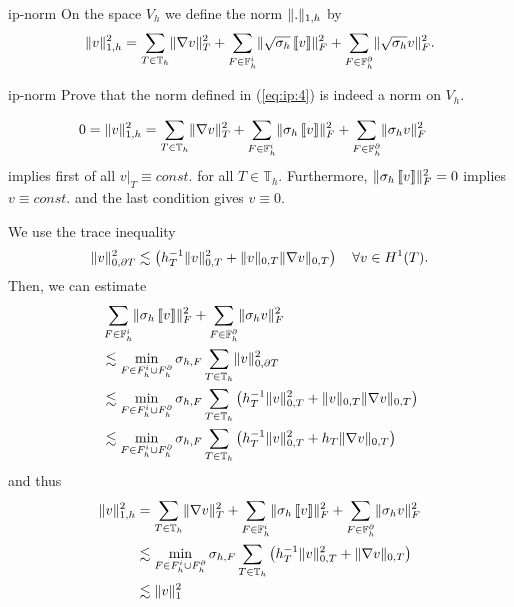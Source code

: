 \begin{Definition}{ip-norm}
  On the space $V_h$ we define the norm $\lVert.\rVert_{1,h}$ by
  \begin{gather}
    \label{eq:ip:4}
    \lVert v\rVert_{1,h}^2 = \sum_{T\in\mathbb T_h} \lVert\nabla v\rVert_T^2
    + \sum_{F\in\mathbb F_h^i} \lVert\sqrt{\sigma_h}\left\llbracket v\right\rrbracket\rVert_F^2
    + \sum_{F\in\mathbb F_h^\partial} \lVert\sqrt{\sigma_h}v\rVert_F^2.
  \end{gather}
\end{Definition}

\begin{Problem}{ip-norm}
  Prove that the norm defined in (\ref{eq:ip:4}) is indeed a norm on $V_h$.
\begin{solution}
\begin{align*}
  0=\lVert v\rVert_{1,h}^2 &= \sum_{T\in\mathbb T_h} \lVert\nabla v\rVert_T^2
    + \sum_{F\in\mathbb F_h^i} \lVert\sigma_h\left\llbracket v\right\rrbracket\rVert_F^2
    + \sum_{F\in\mathbb F_h^\partial} \lVert\sigma_hv\rVert_F^2
\end{align*}
implies first of all $v|_T \equiv const.$ for all $T \in \mathbb{T}_h$.
Furthermore, $\lVert\sigma_h\left\llbracket v\right\rrbracket\rVert_F^2=0$ implies $v \equiv const.$
and the last condition gives $v \equiv 0$.

 We use the trace inequality
 \begin{align*}
  \lVert v\rVert_{0,\partial T}^2
  \lesssim \left( h_T^{-1} \lVert v\rVert_{0,T}^2+\lVert v\rVert_{0,T}\lVert\nabla v\rVert_{0,T}\right)
  \quad \forall v \in H^1(T).
 \end{align*}
 Then, we can estimate
 \begin{align*}
  &\sum_{F\in\mathbb F_h^i} \lVert\sigma_h\left\llbracket v\right\rrbracket\rVert_F^2 + \sum_{F\in\mathbb F_h^\partial} \lVert\sigma_hv\rVert_F^2\\
  &\lesssim \min_{F\in F_h^i\cup F_h^\partial} \sigma_{h,F} \sum_{T \in \mathbb{T}_h}\lVert v\rVert_{0,\partial T}^2 \\
  &\lesssim \min_{F\in F_h^i\cup F_h^\partial} \sigma_{h,F} \sum_{T \in \mathbb{T}_h}\left( h_T^{-1}
  \lVert v\rVert_{0,T}^2+\lVert v\rVert_{0,T}\lVert\nabla v\rVert_{0,T}\right)\\
  &\lesssim \min_{F\in F_h^i\cup F_h^\partial} \sigma_{h,F} \sum_{T \in \mathbb{T}_h}\left( h_T^{-1}
  \lVert v\rVert_{0,T}^2+h_T\lVert\nabla v\rVert_{0,T}\right)
 \end{align*}
 and thus
 \begin{align*}
    \lVert v\rVert_{1,h}^2 &= \sum_{T\in\mathbb T_h} \lVert\nabla v\rVert_T^2
    + \sum_{F\in\mathbb F_h^i} \lVert\sigma_h\left\llbracket v\right\rrbracket\rVert_F^2
    + \sum_{F\in\mathbb F_h^\partial} \lVert\sigma_hv\rVert_F^2\\
    &\lesssim \min_{F\in F_h^i\cup F_h^\partial} \sigma_{h,F}
      \sum_{T \in \mathbb{T}_h}\left( h_T^{-1} \lVert v\rVert_{0,T}^2+\lVert\nabla v\rVert_{0,T}\right)\\
  &\lesssim \lVert v\rVert_1^2
  \end{align*}
\end{solution}
\end{Problem}

